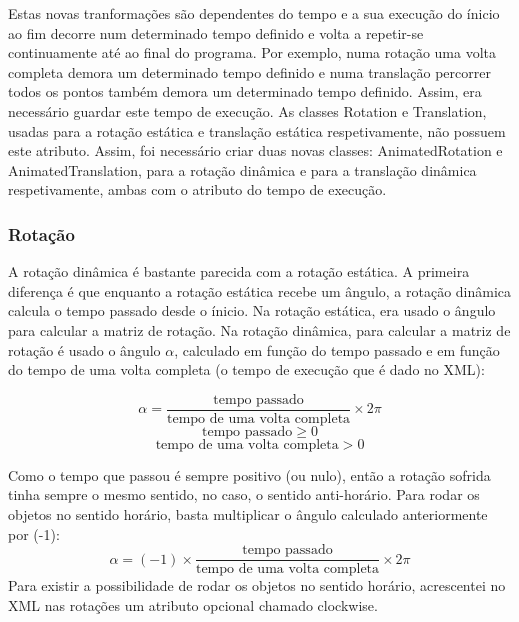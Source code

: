 \documentclass[12pt, a4paper]{article}
\begin{document}
Estas novas tranformações são dependentes do tempo e a sua execução do ínicio ao fim decorre
num determinado tempo definido e volta a repetir-se continuamente até ao final do programa.
Por exemplo, numa rotação uma volta completa demora um determinado tempo definido e numa translação
percorrer todos os pontos também demora um determinado tempo definido. Assim, era necessário guardar
este tempo de execução. As classes Rotation e Translation, usadas para a rotação estática e
translação estática respetivamente, não possuem este atributo. Assim, foi necessário criar duas
novas classes: AnimatedRotation e AnimatedTranslation, para a rotação dinâmica e para a translação
dinâmica respetivamente, ambas com o atributo do tempo de execução.

\subsubsection{Rotação}

A rotação dinâmica é bastante parecida com a rotação estática. A primeira diferença é que enquanto a
rotação estática recebe um ângulo, a rotação dinâmica calcula o tempo passado desde o ínicio. Na
rotação estática, era usado o ângulo para calcular a matriz de rotação. Na rotação dinâmica, para
calcular a matriz de rotação é usado o ângulo $\alpha$, calculado em função do tempo passado e em
função do tempo de uma volta completa (o tempo de execução que é dado no XML):

$$
\alpha = \frac{\text{tempo passado}}{\text{tempo de uma volta completa}} \times 2\pi
$$
$$
$$
$$
\text{tempo passado} \geq 0
$$
$$
\text{tempo de uma volta completa} > 0
$$

Como o tempo que passou é sempre positivo (ou nulo), então a rotação sofrida tinha sempre o
mesmo sentido, no caso, o sentido anti-horário. Para rodar os objetos no sentido
horário, basta multiplicar o ângulo calculado anteriormente por (-1):
$$
\alpha = (-1) \times \frac{\text{tempo passado}}{\text{tempo de uma volta completa}} \times 2\pi
$$
Para existir a possibilidade de rodar os objetos no sentido horário, acrescentei no XML nas
rotações um atributo opcional chamado clockwise.
\end{document}
